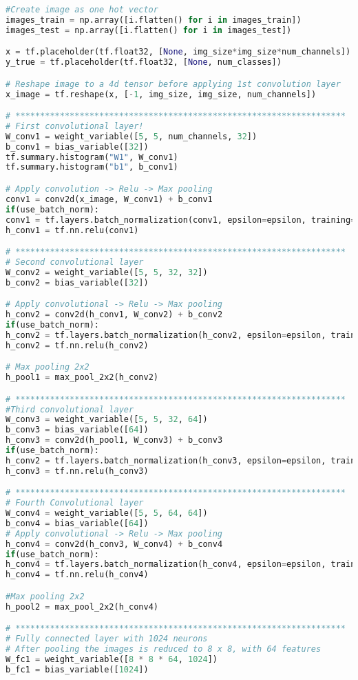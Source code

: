 \begin{lstlisting}[language=Python, label=lst:neuralnet.py, caption={neural\_net.py}, basicstyle=\tiny]
#Create image as one hot vector
images_train = np.array([i.flatten() for i in images_train])
images_test = np.array([i.flatten() for i in images_test])

x = tf.placeholder(tf.float32, [None, img_size*img_size*num_channels])
y_true = tf.placeholder(tf.float32, [None, num_classes])

# Reshape image to a 4d tensor before applying 1st convolution layer
x_image = tf.reshape(x, [-1, img_size, img_size, num_channels])

# *******************************************************************
# First convolutional layer!
W_conv1 = weight_variable([5, 5, num_channels, 32])
b_conv1 = bias_variable([32])
tf.summary.histogram("W1", W_conv1)
tf.summary.histogram("b1", b_conv1)

# Apply convolution -> Relu -> Max pooling
conv1 = conv2d(x_image, W_conv1) + b_conv1
if(use_batch_norm):
conv1 = tf.layers.batch_normalization(conv1, epsilon=epsilon, training=is_training)
h_conv1 = tf.nn.relu(conv1)

# *******************************************************************
# Second convolutional layer
W_conv2 = weight_variable([5, 5, 32, 32])
b_conv2 = bias_variable([32])

# Apply convolutional -> Relu -> Max pooling
h_conv2 = conv2d(h_conv1, W_conv2) + b_conv2
if(use_batch_norm):
h_conv2 = tf.layers.batch_normalization(h_conv2, epsilon=epsilon, training=is_training)
h_conv2 = tf.nn.relu(h_conv2)

# Max pooling 2x2
h_pool1 = max_pool_2x2(h_conv2)

# *******************************************************************
#Third convolutional layer
W_conv3 = weight_variable([5, 5, 32, 64])
b_conv3 = bias_variable([64])
h_conv3 = conv2d(h_pool1, W_conv3) + b_conv3
if(use_batch_norm):
h_conv2 = tf.layers.batch_normalization(h_conv3, epsilon=epsilon, training=is_training)
h_conv3 = tf.nn.relu(h_conv3)

# *******************************************************************
# Fourth Convolutional layer
W_conv4 = weight_variable([5, 5, 64, 64])
b_conv4 = bias_variable([64])
# Apply convolutional -> Relu -> Max pooling
h_conv4 = conv2d(h_conv3, W_conv4) + b_conv4
if(use_batch_norm):
h_conv4 = tf.layers.batch_normalization(h_conv4, epsilon=epsilon, training=is_training)
h_conv4 = tf.nn.relu(h_conv4)

#Max pooling 2x2
h_pool2 = max_pool_2x2(h_conv4)

# *******************************************************************
# Fully connected layer with 1024 neurons
# After pooling the images is reduced to 8 x 8, with 64 features
W_fc1 = weight_variable([8 * 8 * 64, 1024])
b_fc1 = bias_variable([1024])


\end{lstlisting}
